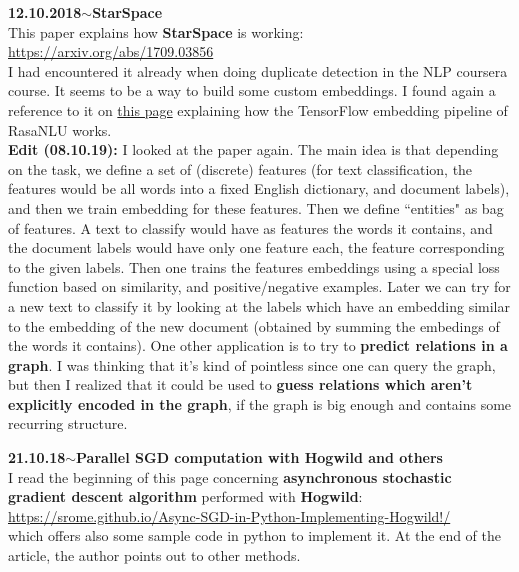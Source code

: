 \documentclass[11pt,a4paper]{article}
\newenvironment{loggentry}[2]%
{\noindent\textbf{#1}\hspace{1cm}$\mathbf{\sim}$\text{ }\textbf{#2}\\}{\vspace{0.5cm}}
\begin{document}
\begin{loggentry}{12.10.2018}{StarSpace}

This paper explains how \textbf{StarSpace} is working:\\
\url{https://arxiv.org/abs/1709.03856}\\
I had encountered it already when doing duplicate detection in the NLP coursera course. It seems to be a way to build some custom embeddings. I found again a reference to it on \href{https://medium.com/rasa-blog/supervised-word-vectors-from-scratch-in-rasa-nlu-6daf794efcd8}{this page} explaining how the TensorFlow embedding pipeline of RasaNLU works.\\
\textbf{Edit (08.10.19):} I looked at the paper again. The main idea is that depending on the task, we define a set of (discrete) features (for text classification, the features would be all words into a fixed English dictionary, and document labels), and then we train embedding for these features. Then we define ``entities" as bag of features. A text to classify would have as features the words it contains, and the document labels would have only one feature each, the feature corresponding to the given labels. Then one trains the features embeddings using a special loss function based on similarity, and positive/negative examples. Later we can try for a new text to classify it by looking at the labels which have an embedding similar to the embedding of the new document (obtained by summing the embedings of the words it contains). One other application is to try to \textbf{predict relations in a graph}. I was thinking that it's kind of pointless since one can query the graph, but then I realized that it could be used to \textbf{guess relations which aren't explicitly encoded in the graph}, if the graph is big enough and contains some recurring structure.

\end{loggentry}

\begin{loggentry}{21.10.18}{Parallel SGD computation with Hogwild and others}

I read the beginning of this page concerning \textbf{asynchronous stochastic gradient descent algorithm} performed with \textbf{Hogwild}:\\
\url{https://srome.github.io/Async-SGD-in-Python-Implementing-Hogwild!/}\\
which offers also some sample code in python to implement it. At the end of the article, the author points out to other methods.\\

\end{loggentry}
\end{document}
